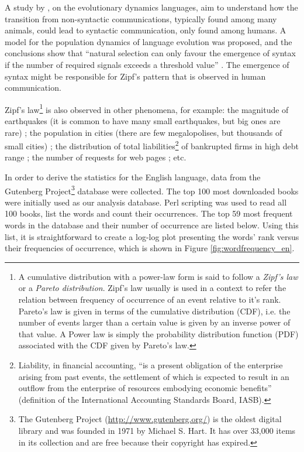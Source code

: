 A study by \cite{nowak2000}, on the evolutionary dynamics languages, aim to understand how the transition from 
non-syntactic communications, typically found among many animals, could lead to syntactic communication,
only found among humans. A model for the population dynamics of language evolution was proposed,
and the conclusions show that ``natural selection can only favour the emergence of syntax
if the number of required signals exceeds a threshold value'' \citep{nowak2000}. The emergence of syntax might be
responsible for Zipf's pattern that is observed in human communication.

Zipf's law\footnote{A cumulative distribution with a power-law form is said to follow a \emph{Zipf's law}
or a \emph{Pareto distribution}. Zipf's law usually is used in a context to refer the relation between frequency
of occurrence of an event relative to it's rank. Pareto's law is given in terms of the cumulative distribution (CDF),
i.e. the number of events larger than a certain value is given by an inverse power of that value. A Power
law is simply the probability distribution function (PDF) associated with the CDF given by Pareto's law.} 
is also observed in other phenomena, for example: the magnitude of earthquakes 
(it is common to have many small earthquakes, but big ones are rare) \citep{suzuki2005}; 
the population in cities (there are few megalopolises, but thousands of small cities) \citep{gabaix1999}; 
the distribution of total liabilities\footnote{Liability, in financial accounting, 
``is a present obligation of the enterprise arising from past events, the settlement of which 
is expected to result in an outflow from the enterprise of resources embodying economic benefits'' 
(definition of the International Accounting Standards Board, IASB).} of bankrupted firms in high 
debt range \citep{fujiwara2004}; the number of requests for web pages \citep{huberman2002}; etc.

In order to derive the statistics for the English language, data from the Gutenberg Project\footnote{The Gutenberg Project (\url{http://www.gutenberg.org/}) is the oldest digital library and was founded in 1971 by Michael S. Hart. It has over 33,000 items in its collection and are free because their copyright has expired.} database were collected. The top 100 most downloaded books were initially used as our analysis database. Perl scripting was used to read all 100 books, list the words and count their occurrences. The top 59 most frequent words in the database and their number of occurrence are listed below. Using this list, it is straightforward to create a log-log plot presenting the words' rank versus their frequencies of occurrence, which is shown in Figure \ref{fig:wordfrequency_en}.

